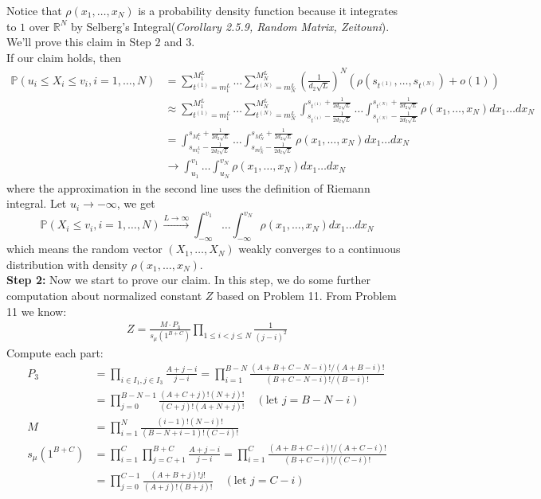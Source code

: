 \documentclass[12pt]{article}
\begin{document}
Notice that $\rho(x_1,\dots, x_{N})$ is a probability density function because it integrates to $1$ over $\mathbb{R}^{N}$ by Selberg's Integral(\emph{Corollary 2.5.9, Random Matrix, Zeitouni}). We'll prove this claim in Step $2$ and $3$.\\
If our claim holds, then
\begin{align*}
	\mathbb{P}(u_{i}\leqslant X_{i} \leqslant v_{i}, i=1, \dots, N)&=\sum_{t^{(1)}=m_{1}^{L}}^{M_{1}^{L}}\dots\sum_{t^{(N)}=m_{N}^{L}}^{M_{N}^{L}}(\frac{1}{d_{2}\sqrt{L}})^{N}(\rho(s_{t^{(1)}},\dots, s_{t^{(N)}})+o(1))\\
	&\approx \sum_{t^{(1)}=m_{1}^{L}}^{M_{1}^{L}}\dots\sum_{t^{(N)}=m_{N}^{L}}^{M_{N}^{L}}\int_{s_{t^{(1)}}-\frac{1}{2d_{2}\sqrt{L}}}^{s_{t^{(1)}}+\frac{1}{2d_{2}\sqrt{L}}}\dots\int_{s_{t^{(N)}}-\frac{1}{2d_{2}\sqrt{L}}}^{s_{t^{(N)}}+\frac{1}{2d_{2}\sqrt{L}}}\rho(x_1,\dots, x_{N})dx_{1}\dots dx_{N}\\
	& = \int_{s_{m^{L}_{1}}-\frac{1}{2d_{2}\sqrt{L}}}^{s_{M^{L}_{1}}+\frac{1}{2d_{2}\sqrt{L}}}\dots\int_{s_{m^{L}_{N}}-\frac{1}{2d_{2}\sqrt{L}}}^{s_{M^{L}_{N}}+\frac{1}{2d_{2}\sqrt{L}}}\rho(x_1,\dots, x_{N})dx_{1}\dots dx_{N}\\
	& \rightarrow \int_{u_{1}}^{v_{1}}\dots\int_{u_{N}}^{v_{N}}\rho(x_1,\dots, x_{N})dx_{1}\dots dx_{N}
\end{align*}
where the approximation in the second line uses the definition of Riemann integral.
Let $u_{i}\rightarrow -\infty$, we get $$\mathbb{P}(X_{i} \leqslant v_{i}, i=1, \dots, N)\xrightarrow{L\rightarrow\infty} \int_{-\infty}^{v_{1}}\dots\int_{-\infty}^{v_{N}}\rho(x_1,\dots, x_{N})dx_{1}\dots dx_{N}$$ which means the random vector $(X_{1},\dots,X_{N})$ weakly converges to a continuous distribution with density $\rho(x_{1},\dots,x_{N})$.\\
\textbf{Step 2:} Now we start to prove our claim. In this step, we do some further computation about normalized constant $Z$ based on Problem 11.
From Problem 11 we know:
\begin{align*}
	Z=\frac{M\cdot P_{3}}{s_{\mu}(1^{B+C})}\prod_{1\leqslant i<j\leqslant N}\frac{1}{(j-i)^{2}}
\end{align*}
Compute each part:
\begin{align*}
	P_{3} &= \prod_{i\in I_{1},j\in I_{3}}\frac{A+j-i}{j-i} = \prod_{i=1}^{B-N}\frac{(A+B+C-N-i)!/(A+B-i)!}{(B+C-N-i)!/(B-i)!}\\ &=\prod_{j=0}^{B-N-1}\frac{(A+C+j)!(N+j)!}{(C+j)!(A+N+j)!}\quad(\text{let $j=B-N-i$})\\
	M &=\prod_{i=1}^{N}\frac{(i-1)!(N-i)!}{(B-N+i-1)!(C-i)!}\\
	s_{\mu}(1^{B+C})&=\prod_{i=1}^{C}\prod_{j=C+1}^{B+C}\frac{A+j-i}{j-i}=\prod_{i=1}^{C}\frac{(A+B+C-i)!/(A+C-i)!}{(B+C-i)!/(C-i)!}\\ &= \prod_{j=0}^{C-1}\frac{(A+B+j)!j!}{(A+j)!(B+j)!}\quad(\text{let $j=C-i$})
\end{align*}
\end{document}
